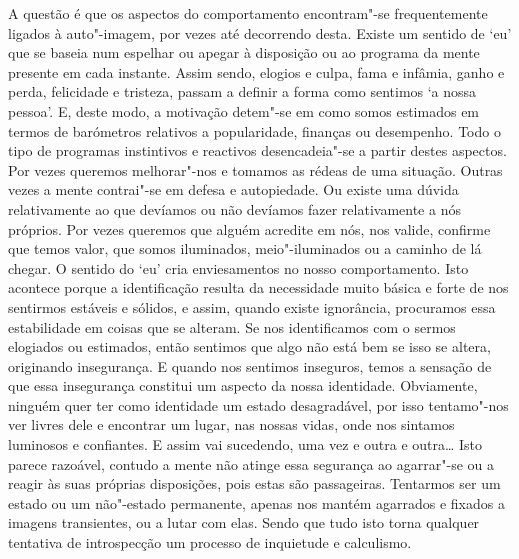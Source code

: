 A questão é que os aspectos do comportamento encontram"-se frequentemente ligados à auto"-imagem, por vezes até decorrendo desta. Existe um sentido de `eu' que se baseia num espelhar ou apegar à disposição ou ao programa da mente presente em cada instante. Assim sendo, elogios e culpa, fama e infâmia, ganho e perda, felicidade e tristeza, passam a definir a forma como sentimos `a nossa pessoa'. E, deste modo, a motivação detem"-se em como somos estimados em termos de barómetros relativos a popularidade, finanças ou desempenho. Todo o tipo de programas instintivos e reactivos desencadeia"-se a partir destes aspectos. Por vezes queremos melhorar"-nos e tomamos as rédeas de uma situação. Outras vezes a mente contrai"-se em defesa e autopiedade. Ou existe uma dúvida relativamente ao que devíamos ou não devíamos fazer relativamente a nós próprios. Por vezes queremos que alguém acredite em nós, nos valide, confirme que temos valor, que somos iluminados, meio"-iluminados ou a caminho de lá chegar. O sentido do `eu' cria enviesamentos no nosso comportamento. Isto acontece porque a identificação resulta da necessidade muito básica e forte de nos sentirmos estáveis e sólidos, e assim, quando existe ignorância, procuramos essa estabilidade em coisas que se alteram. Se nos identificamos com o sermos elogiados ou estimados, então sentimos que algo não está bem se isso se altera, originando insegurança. E quando nos sentimos inseguros, temos a sensação de que essa insegurança constitui um aspecto da nossa identidade. Obviamente, ninguém quer ter como identidade um estado desagradável, por isso tentamo"-nos ver livres dele e encontrar um lugar, nas nossas vidas, onde nos sintamos luminosos e confiantes. E assim vai sucedendo, uma vez e outra e outra\ldots{} Isto parece razoável, contudo a mente não atinge essa segurança ao agarrar"-se ou a reagir às suas próprias disposições, pois estas são passageiras. Tentarmos ser um estado ou um não"-estado permanente, apenas nos mantém agarrados e fixados a imagens transientes, ou a lutar com elas. Sendo que tudo isto torna qualquer tentativa de introspecção um processo de inquietude e calculismo.

